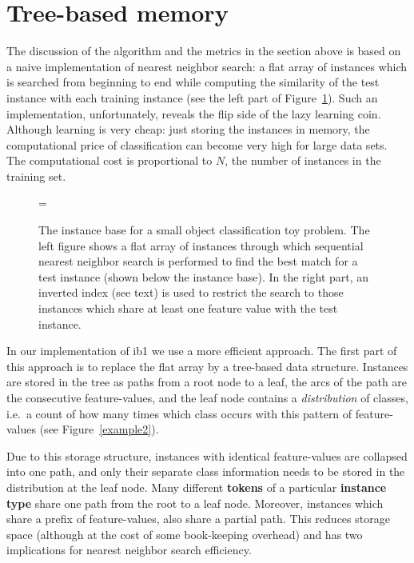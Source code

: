 \documentclass{report}
\begin{document}
\section{Tree-based memory}
\label{tree-base}

The discussion of the algorithm and the metrics in the section above
is based on a naive implementation of nearest neighbor search: a flat
array of instances which is searched from beginning to end while
computing the similarity of the test instance with each training
instance (see the left part of Figure~\ref{example1}). Such an
implementation, unfortunately, reveals the flip side of the lazy
learning coin. Although learning is very cheap: just storing the
instances in memory, the computational price of classification can
become very high for large data sets. The computational cost is
proportional to $N$, the number of instances in the training set.

\begin{figure}[htb]
        \begin{center}
                \leavevmode
                \epsfxsize=\columnwidth
                \caption{The instance base for a small object
                classification toy problem. The left figure shows a
                flat array of instances through which sequential
                nearest neighbor search is performed to find the best 
		match for a test instance (shown below the instance
                base). 
		In the right part, an inverted index (see text)
                is used to restrict the search to those instances
                which share at least one feature value with the test
                instance.
                }
                \label{example1}
        \end{center}
\end{figure}

In our implementation of {\sc ib1} we use a more efficient
approach. The first part of this approach is to replace the flat array
by a tree-based data structure. Instances are stored in the tree as
paths from a root node to a leaf, the arcs of the path are the
consecutive feature-values, and the leaf node contains a {\em
distribution} of classes, i.e.~a count of how many times which class
occurs with this pattern of feature-values (see Figure~\ref{example2}).

Due to this storage structure, instances with identical feature-values
are collapsed into one path, and only their separate class
information needs to be stored in the distribution at the leaf
node. Many different {\bf tokens} of a particular {\bf instance type}
share one path from the root to a leaf node. Moreover, instances which
share a prefix of feature-values, also share a partial path. This
reduces storage space (although at the cost of some book-keeping
overhead) and has two implications for nearest neighbor search
efficiency.
\end{document}
